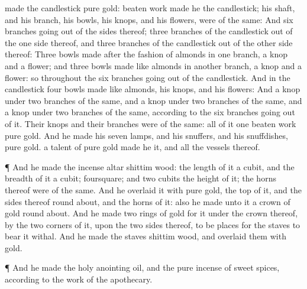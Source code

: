 {made the
candlestick
{}
pure
gold:
{} beaten
work
made he the
candlestick; his
shaft, and his
branch, his
bowls, his
knops, and his
flowers, were of the same:
And
six
branches going
out of the
sides thereof;
three
branches of the
candlestick out of the
one
side thereof, and
three
branches of the
candlestick out of the
other
side thereof:
Three
bowls made after the fashion of
almonds in
one
branch, a
knop and a
flower; and
three
bowls made like
almonds in
another
branch, a
knop and a
flower: so throughout the
six
branches going
out of the
candlestick.
And in the
candlestick
{}
four
bowls made like
almonds, his
knops, and his
flowers:
And a
knop under
two
branches of the same, and a
knop under
two
branches of the same, and a
knop under
two
branches of the same, according to the
six
branches going
out of it.
Their
knops and their
branches were of the same: all of it
{}
one beaten
work
{}
pure
gold.
And he
made his
seven
lamps, and his
snuffers, and his
snuffdishes,
{}
pure
gold.
 a
talent of
pure
gold
made he it, and all the
vessels thereof.
\par }{\PP {}¶ And he
made the
incense
altar
{}
shittim
wood: the
length of it
{} a
cubit, and the
breadth of it a
cubit;
{}
foursquare; and two
cubits
{} the
height of it; the
horns thereof were of the same.
And he
overlaid it with
pure
gold,
{} the
top of it, and the
sides thereof round
about, and the
horns of it: also he
made unto it a
crown of
gold round
about.
And he
made
two
rings of
gold for it under the
crown thereof, by the
two
corners of it, upon the
two
sides thereof, to be
places for the
staves to
bear it withal.
And he
made the
staves
{}
shittim
wood, and
overlaid them with
gold.
\par }{\PP {}¶ And he
made the
holy
anointing
oil, and the
pure
incense of sweet
spices, according to the
work of the
apothecary.

}

